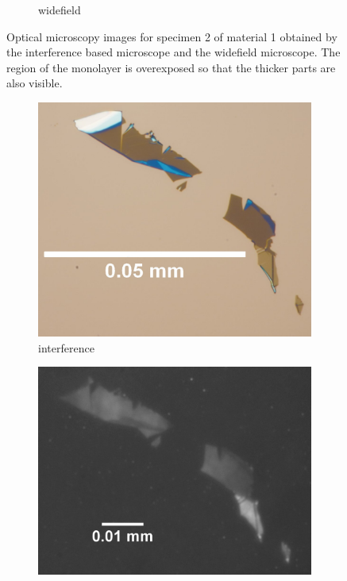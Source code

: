 \begin{figure}[H]
\begin{subfigure}{0.4\textwidth}
        \caption{widefield}
	      \label{fig_mono_spec2_wide}
    \end{subfigure}
    \caption{Optical microscopy images for specimen 2 of material 1 obtained by the interference based microscope and the widefield microscope. The region of the monolayer is overexposed so that the thicker parts are also visible.}
	\label{fig_mono_spec2} %
\end{figure}

\begin{figure}[H]
    \centering
    \begin{subfigure}{0.4\textwidth}
        \centering
        \includegraphics[width=1.0\textwidth]{img/output_t1/M2_1_100_adj}
        \caption{interference}
	      \label{fig_mono_spec3_int}
    \end{subfigure}
    \begin{subfigure}{0.49\textwidth}
        \centering
        \includegraphics[width=\textwidth]{img/output_t1/M2_1_50_adj_photo4}

\end{subfigure}
\end{figure}
